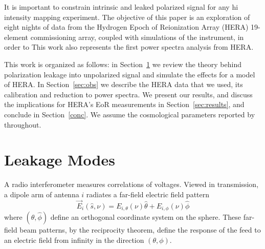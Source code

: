 \documentclass[twocolumn, trackchanges]{aastex61}
\begin{document}
It is important to constrain intrinsic and leaked polarized signal for any {\sc hi} intensity mapping experiment. The objective of this paper is an exploration of eight nights of data from the Hydrogen Epoch of Reionization Array (HERA) 19-element commissioning array, coupled with simulations of the instrument, in order to  
This work also represents the first power spectra analysis from HERA. 

This work is organized as follows: in Section~\ref{sec:leak} we review the theory behind polarization leakage into unpolarized signal and simulate the effects  for a model of HERA. In Section~\ref{sec:obs} we describe the HERA data that we used, its calibration and reduction to power spectra. We present our results, and discuss the implications for HERA's EoR measurements in Section~\ref{sec:results}, and conclude in Section~\ref{conc}. We assume the cosmological parameters reported by \cite{Planck.16} throughout.

\section{Leakage Modes}
\label{sec:leak}

A radio interferometer measures correlations of voltages. Viewed in transmission, a dipole arm of antenna $i$ radiates a far-field electric field pattern
\begin{equation}
\vec{E}_{i}(\hat{s}, \nu) = E_{i,\theta}(\nu)\hat{\theta} + E_{i,\phi}(\nu)\hat{\phi}
\end{equation}
where $(\hat{\theta},\hat{\phi})$ define an orthogonal coordinate system on the sphere. These far-field beam patterns, by the reciprocity theorem, define the response of the feed to an electric field from infinity in the direction $(\theta,\phi)$. 
\end{document}
